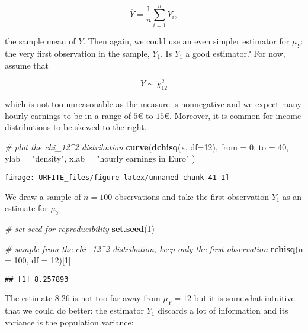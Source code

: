\documentclass[]{book}
\newenvironment{Shaded}{\begin{snugshade}}{\end{snugshade}}
\newcommand{\KeywordTok}[1]{\textcolor[rgb]{0.13,0.29,0.53}{\textbf{#1}}}
\newcommand{\DataTypeTok}[1]{\textcolor[rgb]{0.13,0.29,0.53}{#1}}
\newcommand{\DecValTok}[1]{\textcolor[rgb]{0.00,0.00,0.81}{#1}}
\newcommand{\StringTok}[1]{\textcolor[rgb]{0.31,0.60,0.02}{#1}}
\newcommand{\CommentTok}[1]{\textcolor[rgb]{0.56,0.35,0.01}{\textit{#1}}}
\newcommand{\NormalTok}[1]{#1}
\theoremstyle{definition}
\theoremstyle{definition}
\theoremstyle{definition}
\theoremstyle{remark}
\begin{document}
\[ \overline{Y} = \frac{1}{n} \sum_{i=1}^n Y_i, \]

the sample mean of \(Y\). Then again, we could use an even simpler
estimator for \(\mu_Y\): the very first observation in the sample,
\(Y_1\). Is \(Y_1\) a good estimator? For now, assume that

\[ Y \sim \chi_{12}^2 \]

which is not too unreasonable as the measure is nonnegative and we
expect many hourly earnings to be in a range of \(5€\) to \(15€\).
Moreover, it is common for income distributions to be skewed to the
right.

\begin{Shaded}
\begin{Highlighting}[]
\CommentTok{# plot the chi_12^2 distribution}
\KeywordTok{curve}\NormalTok{(}\KeywordTok{dchisq}\NormalTok{(x, }\DataTypeTok{df=}\DecValTok{12}\NormalTok{), }
      \DataTypeTok{from =} \DecValTok{0}\NormalTok{, }
      \DataTypeTok{to =} \DecValTok{40}\NormalTok{, }
      \DataTypeTok{ylab =} \StringTok{"density"}\NormalTok{, }
      \DataTypeTok{xlab =} \StringTok{"hourly earnings in Euro"}
\NormalTok{      )}
\end{Highlighting}
\end{Shaded}

\begin{center}\texttt{[image: URFITE\_files/figure-latex/unnamed-chunk-41-1]} \end{center}

We draw a sample of \(n=100\) observations and take the first
observation \(Y_1\) as an estimate for \(\mu_Y\)

\begin{Shaded}
\begin{Highlighting}[]
\CommentTok{# set seed for reproducibility}
\KeywordTok{set.seed}\NormalTok{(}\DecValTok{1}\NormalTok{)}

\CommentTok{# sample from the chi_12^2 distribution, keep only the first observation}
\KeywordTok{rchisq}\NormalTok{(}\DataTypeTok{n =} \DecValTok{100}\NormalTok{, }\DataTypeTok{df =} \DecValTok{12}\NormalTok{)[}\DecValTok{1}\NormalTok{]}
\end{Highlighting}
\end{Shaded}

\begin{verbatim}
## [1] 8.257893
\end{verbatim}

The estimate \(8.26\) is not too far away from \(\mu_Y = 12\) but it is
somewhat intuitive that we could do better: the estimator \(Y_1\)
discards a lot of information and its variance is the population
variance:
\end{document}
